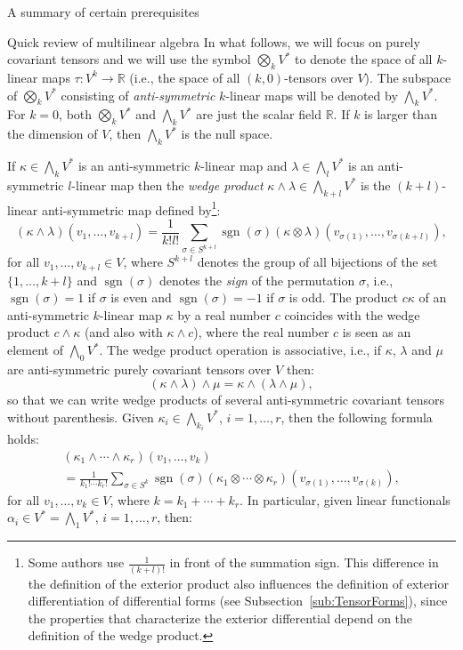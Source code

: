 \documentclass[oneside,a4paper,11pt]{amsbook}
\newcommand{\R}{\mathds R}
\DeclareMathOperator{\sgn}{sgn}
\theoremstyle{remark}\newtheorem{exercise}{Exercise}[chapter]
\theoremstyle{plain}\newtheorem{teo}{Theorem}[section]
\theoremstyle{plain}\newtheorem{lem}[teo]{Lemma}
\theoremstyle{plain}\newtheorem{prop}[teo]{Proposition}
\theoremstyle{plain}\newtheorem{cor}[teo]{Corollary}
\theoremstyle{definition}\newtheorem{defin}[teo]{Definition}
\theoremstyle{remark}\newtheorem{rem}[teo]{Remark}
\theoremstyle{definition}\newtheorem{notation}[teo]{Notation}
\theoremstyle{definition}\newtheorem{convention}[teo]{Convention}
\theoremstyle{definition}\newtheorem{example}[teo]{Example}
\numberwithin{section}{chapter}
\numberwithin{equation}{section}
\begin{document}
\begin{chapter}{A summary of certain prerequisites}
\begin{section}{Quick review of multilinear algebra}
In what follows, we will focus on purely covariant tensors and we will
use the symbol $\bigotimes_k V^*$ to denote the space of all $k$-linear maps $\tau:V^k\to\R$ (i.e., the space of
all $(k,0)$-tensors over $V$). The subspace of $\bigotimes_k V^*$ consisting of {\em anti-symmetric\/} $k$-linear maps will
be denoted by $\bigwedge_k V^*$. For $k=0$, both $\bigotimes_kV^*$ and $\bigwedge_kV^*$ are just the scalar field $\R$. If $k$ is
larger than the dimension of $V$, then $\bigwedge_kV^*$ is the null space.

If $\kappa\in\bigwedge_kV^*$ is an anti-symmetric $k$-linear map and $\lambda\in\bigwedge_lV^*$ is an anti-symmetric
$l$-linear map then the {\em wedge product\/} $\kappa\wedge\lambda\in\bigwedge_{k+l}V^*$ is the $(k+l)$-linear
anti-symmetric map defined by\footnote{%
Some authors use $\frac1{(k+l)!}$ in front of the summation sign. This difference in the definition of the
exterior product also influences the definition of exterior differentiation of differential forms
(see Subsection~\ref{sub:TensorForms}), since the properties
that characterize the exterior differential depend on the definition of the wedge product.}:
\[(\kappa\wedge\lambda)(v_1,\ldots,v_{k+l})=\frac1{k!l!}\sum_{\sigma\in S^{k+l}}
\sgn(\sigma)(\kappa\otimes\lambda)(v_{\sigma(1)},\ldots,v_{\sigma(k+l)}),\]
for all $v_1,\ldots,v_{k+l}\in V$, where $S^{k+l}$ denotes the group of all bijections of the set $\{1,\ldots,k+l\}$ and $\sgn(\sigma)$ denotes the {\em sign\/}
of the permutation $\sigma$, i.e., $\sgn(\sigma)=1$ if $\sigma$ is even and $\sgn(\sigma)=-1$ if $\sigma$ is odd.
The product $c\kappa$ of an anti-symmetric $k$-linear map $\kappa$ by a real number $c$
coincides with the wedge product $c\wedge\kappa$ (and also with $\kappa\wedge c$), where the real number $c$ is seen as
an element of $\bigwedge_0V^*$. The wedge product operation is associative, i.e., if $\kappa$, $\lambda$ and $\mu$ are anti-symmetric purely covariant
tensors over $V$ then:
\[(\kappa\wedge\lambda)\wedge\mu=\kappa\wedge(\lambda\wedge\mu),\]
so that we can write wedge products of several anti-symmetric covariant tensors without parenthesis. Given $\kappa_i\in\bigwedge_{k_i}V^*$, $i=1,\ldots,r$, then
the following formula holds:
\begin{multline*}
(\kappa_1\wedge\cdots\wedge\kappa_r)(v_1,\ldots,v_k)\\
=\frac1{k_1!\cdots k_r!}\sum_{\sigma\in S^k}
\sgn(\sigma)(\kappa_1\otimes\cdots\otimes\kappa_r)(v_{\sigma(1)},\ldots,v_{\sigma(k)}),
\end{multline*}
for all $v_1,\ldots,v_k\in V$, where $k=k_1+\cdots+k_r$. In particular, given linear functionals $\alpha_i\in V^*=\bigwedge_1V^*$, $i=1,\ldots,r$, then:

\end{section}
\end{chapter}
\end{document}
